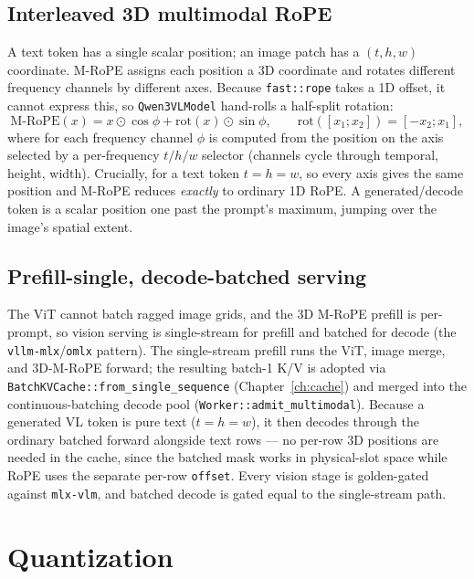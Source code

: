 \documentclass[11pt,a4paper]{report}
\newcommand{\code}[1]{\texttt{#1}}
\newcommand{\elemmul}{\odot}
\begin{document}
\section{Interleaved 3D multimodal RoPE}
A text token has a single scalar position; an image patch has a $(t, h, w)$
coordinate. M-RoPE assigns each position a 3D coordinate and rotates different
frequency channels by different axes. Because \code{fast::rope} takes a 1D offset, it
cannot express this, so \code{Qwen3VLModel} hand-rolls a half-split rotation:
\begin{equation}
  \text{M-RoPE}(x) = x \elemmul \cos\phi + \text{rot}(x)\elemmul \sin\phi,
  \qquad \text{rot}([x_1;x_2]) = [-x_2; x_1],
\end{equation}
where for each frequency channel $\phi$ is computed from the position on the axis
selected by a per-frequency $t/h/w$ selector (channels cycle through temporal,
height, width). Crucially, for a text token $t=h=w$, so every axis gives the same
position and M-RoPE reduces \emph{exactly} to ordinary 1D RoPE. A generated/decode
token is a scalar position one past the prompt's maximum, jumping over the image's
spatial extent.

\section{Prefill-single, decode-batched serving}
The ViT cannot batch ragged image grids, and the 3D M-RoPE prefill is per-prompt, so
vision serving is single-stream for prefill and batched for decode (the
\code{vllm-mlx}/\code{omlx} pattern). The single-stream prefill runs the ViT, image
merge, and 3D-M-RoPE forward; the resulting batch-1 K/V is adopted via
\code{BatchKVCache::from\_single\_sequence} (Chapter~\ref{ch:cache}) and merged into
the continuous-batching decode pool (\code{Worker::admit\_multimodal}). Because a
generated VL token is pure text ($t=h=w$), it then decodes through the ordinary
batched forward alongside text rows --- no per-row 3D positions are needed in the
cache, since the batched mask works in physical-slot space while RoPE uses the
separate per-row \code{offset}. Every vision stage is golden-gated against
\code{mlx-vlm}, and batched decode is gated equal to the single-stream path.

\chapter{Quantization}
\label{ch:quant}
\end{document}
